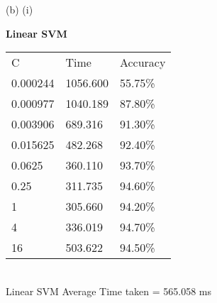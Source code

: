 \documentclass[12pt]{article}
\newenvironment{problem}[2][Problem]{\begin{trivlist}
\item[\hskip \labelsep {\bfseries #1}\hskip \labelsep {\bfseries #2.}]}{\end{trivlist}}
\begin{document}
\begin{problem} 6 (b) (i)
\end{problem}
\begin{Answer}
\textbf{Linear SVM}\\ 
    \begin{tabular}{lll}
    C        & Time     & Accuracy \\ 
    0.000244 & 1056.600 & 55.75\%  \\
    0.000977 & 1040.189 & 87.80\%  \\
    0.003906 & 689.316  & 91.30\%  \\
    0.015625 & 482.268  & 92.40\%  \\
    0.0625   & 360.110  & 93.70\%  \\
    0.25     & 311.735  & 94.60\%  \\
    1        & 305.660  & 94.20\%  \\
    4        & 336.019  & 94.70\%  \\
    16       & 503.622  & 94.50\%  \\ 
    \end{tabular}\\

Linear SVM Average Time taken = 565.058 ms\\
\end{Answer}
\end{document}
